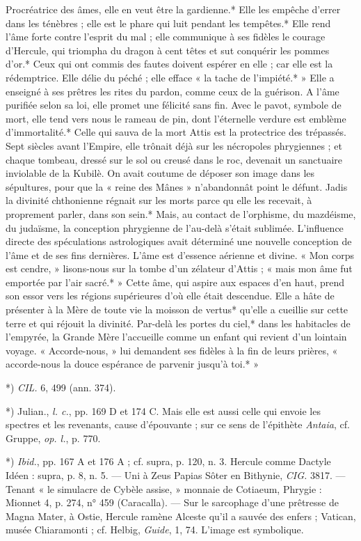 \documentclass[a4paper, 11pt, oneside, polutonikogreek, french]{article}
\begin{document}
Procréatrice des âmes, elle en veut être la gardienne.* Elle les empêche d'errer dans les ténèbres ; elle est le phare qui luit pendant les tempêtes.* Elle rend l'âme forte contre l'esprit du mal ; elle communique à ses fidèles le courage d'Hercule, qui triompha du dragon à cent têtes et sut conquérir les pommes d'or.* Ceux qui ont commis des fautes doivent espérer en elle ; car elle est la rédemptrice. Elle délie du péché ; elle efface « la tache de l'impiété.* » Elle a enseigné à ses prêtres les rites du pardon, comme ceux de la guérison. A l'âme purifiée selon sa loi, elle promet une félicité sans fin. Avec le pavot, symbole de mort, elle tend vers nous le rameau de pin, dont l'éternelle verdure est emblème d'immortalité.* Celle qui sauva de la mort Attis est la protectrice des trépassés. Sept siècles avant l'Empire, elle trônait déjà sur les nécropoles phrygiennes ; et chaque tombeau, dressé sur le sol ou creusé dans le roc, devenait un sanctuaire inviolable de la Kubilè. On avait coutume de déposer son image dans les sépultures, pour que la « reine des Mânes » n'abandonnât point le défunt. Jadis la divinité chthonienne régnait sur les morts parce qu elle les recevait, à proprement parler, dans son sein.* Mais, au contact de l'orphisme, du mazdéisme, du judaïsme, la conception phrygienne de l'au-delà s'était sublimée. L'influence directe des spéculations astrologiques avait déterminé une nouvelle conception de l'âme et de ses fins dernières. L'âme est d'essence aérienne et divine. « Mon corps est cendre, » lisons-nous sur la tombe d'un zélateur d'Attis ; « mais mon âme fut emportée par l'air sacré.* » Cette âme, qui aspire aux espaces d'en haut, prend son essor vers les régions supérieures d'où elle était descendue. Elle a hâte de présenter à la Mère de toute vie la moisson de vertus* qu'elle a cueillie sur cette terre et qui réjouit la divinité. Par-delà les portes du ciel,* dans les habitacles de l'empyrée, la Grande Mère l'accueille comme un enfant qui revient d'un lointain voyage. « Accorde-nous, » lui demandent ses fidèles à la fin de leurs prières, « accorde-nous la douce espérance de parvenir jusqu'à toi.* »

*) \emph{CIL.} 6, 499 (ann. 374).

*) Julian., \emph{l. c.}, pp. 169 D et 174 C. Mais elle est aussi celle qui envoie les spectres et les revenants, cause d'épouvante ; sur ce sens de l'épithète \emph{Antaia}, cf. Gruppe, \emph{op. l.}, p. 770.

*) \emph{Ibid.}, pp. 167 A et 176 A ; cf. supra, p. 120, n. 3. Hercule comme Dactyle Idéen : supra, p. 8, n. 5. --- Uni à Zeus Papias Sôter en Bithynie, \emph{CIG.} 3817. --- Tenant « le simulacre de Cybèle assise, » monnaie de Cotiaeum, Phrygie : Mionnet 4, p. 274, n° 459 (Caracalla). --- Sur le sarcophage d'une prêtresse de Magna Mater, à Ostie, Hercule ramène Alceste qu'il a sauvée des enfers ; Vatican, musée Chiaramonti ; cf. Helbig, \emph{Guide}, 1, 74. L'image est symbolique.
\end{document}
